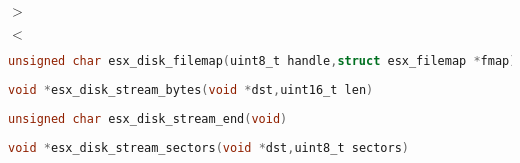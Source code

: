 \documentclass[11pt]{book}
\def\lthtmlcheckvsize{\ifdim\ht\sizebox<\vsize 
  \ifdim\wd\sizebox<\hsize\expandafter\hfill\fi \expandafter\vfill
  \else\expandafter\vss\fi}%
\begin{document}
{\newpage\clearpage
{}%
\(>\)%
\lthtmlindisplaymathZ
\lthtmlcheckvsize\clearpage}

{\newpage\clearpage
{}%
\(<\)%
\lthtmlindisplaymathZ
\lthtmlcheckvsize\clearpage}

{\newpage\clearpage
{}%
\begin{table}\centering
  
\end{table}%
\lthtmlfigureZ
\lthtmlcheckvsize\clearpage}

{\newpage\clearpage
{}%
\begin{table}\centering
  
\end{table}%
\lthtmlfigureZ
\lthtmlcheckvsize\clearpage}

{\newpage\clearpage
{}%
\begin{table}\centering
  
\end{table}%
\lthtmlfigureZ
\lthtmlcheckvsize\clearpage}

{\newpage\clearpage
{}%
\begin{lstlisting}[language=C]
unsigned char esx_disk_filemap(uint8_t handle,struct esx_filemap *fmap)
\end{lstlisting}%
\lthtmlfigureZ
\lthtmlcheckvsize\clearpage}

{\newpage\clearpage
{}%
\begin{lstlisting}[language=C]
void *esx_disk_stream_bytes(void *dst,uint16_t len)
\end{lstlisting}%
\lthtmlfigureZ
\lthtmlcheckvsize\clearpage}

{\newpage\clearpage
{}%
\begin{lstlisting}[language=C]
unsigned char esx_disk_stream_end(void)
\end{lstlisting}%
\lthtmlfigureZ
\lthtmlcheckvsize\clearpage}

{\newpage\clearpage
{}%
\begin{lstlisting}[language=C]
void *esx_disk_stream_sectors(void *dst,uint8_t sectors)
\end{lstlisting}%
\lthtmlfigureZ
\lthtmlcheckvsize\clearpage}
\end{document}
